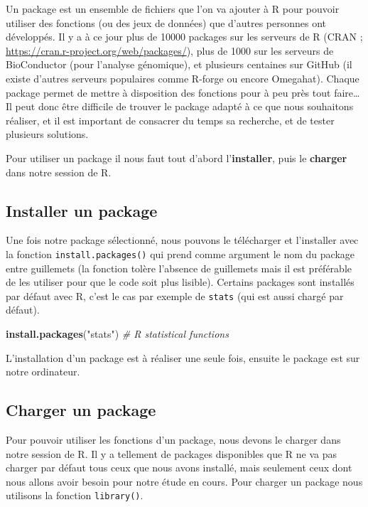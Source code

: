 \documentclass[twoside,symmetric]{book}
\newenvironment{Shaded}{}{}
\newcommand{\CommentTok}[1]{\textit{#1}}
\newcommand{\KeywordTok}[1]{\textbf{#1}}
\newcommand{\NormalTok}[1]{#1}
\newcommand{\StringTok}[1]{#1}
\begin{document}
Un package est un ensemble de fichiers que l'on va ajouter à R pour pouvoir utiliser des fonctions (ou des jeux de données) que d'autres personnes ont développés. Il y a à ce jour plus de 10000 packages sur les serveurs de R (CRAN ; \url{https://cran.r-project.org/web/packages/}), plus de 1000 sur les serveurs de BioConductor (pour l'analyse génomique), et plusieurs centaines sur GitHub (il existe d'autres serveurs populaires comme R-forge ou encore Omegahat). Chaque package permet de mettre à disposition des fonctions pour à peu près tout faire\ldots{} Il peut donc être difficile de trouver le package adapté à ce que nous souhaitons réaliser, et il est important de consacrer du temps sa recherche, et de tester plusieurs solutions.

Pour utiliser un package il nous faut tout d'abord l'\textbf{installer}, puis le \textbf{charger} dans notre session de R.

\hypertarget{installer-un-package}{%
\subsection{Installer un package}\label{installer-un-package}}

Une fois notre package sélectionné, nous pouvons le télécharger et l'installer avec la fonction \texttt{install.packages()} qui prend comme argument le nom du package entre guillemets (la fonction tolère l'absence de guillemets mais il est préférable de les utiliser pour que le code soit plus lisible). Certains packages sont installés par défaut avec R, c'est le cas par exemple de \texttt{stats} (qui est aussi chargé par défaut).

\begin{Shaded}
\begin{Highlighting}[]
\KeywordTok{install.packages}\NormalTok{(}\StringTok{"stats"}\NormalTok{) }\CommentTok{# R statistical functions}
\end{Highlighting}
\end{Shaded}

L'installation d'un package est à réaliser une seule fois, ensuite le package est sur notre ordinateur.

\hypertarget{charger-un-package}{%
\subsection{Charger un package}\label{charger-un-package}}

Pour pouvoir utiliser les fonctions d'un package, nous devons le charger dans notre session de R. Il y a tellement de packages disponibles que R ne va pas charger par défaut tous ceux que nous avons installé, mais seulement ceux dont nous allons avoir besoin pour notre étude en cours. Pour charger un package nous utilisons la fonction \texttt{library()}.
\end{document}
